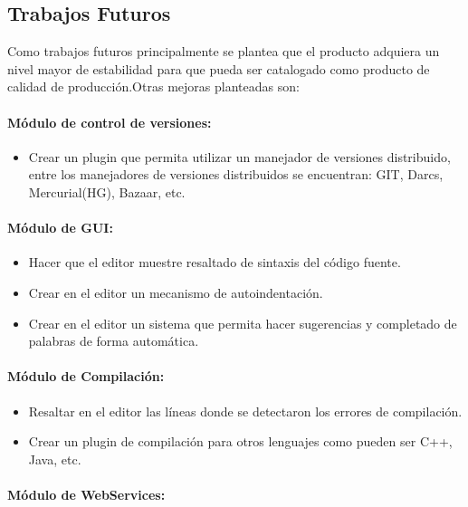 \subsection{Trabajos Futuros}

Como trabajos futuros principalmente se plantea que el producto adquiera un nivel mayor de estabilidad para que pueda ser catalogado como producto de calidad de producción.\newline Otras mejoras planteadas son:

\paragraph{Módulo de control de versiones:}

\begin{itemize}
	\item Crear un plugin que permita utilizar un manejador de versiones distribuido, entre los manejadores de versiones distribuidos se encuentran: GIT, Darcs, Mercurial(HG), Bazaar, etc.
\end{itemize}

\paragraph{Módulo de GUI:}

\begin{itemize}
	\item Hacer que el editor muestre resaltado de sintaxis del código fuente.
	\item Crear en el editor un mecanismo de autoindentación.
	\item Crear en el editor un sistema que permita hacer sugerencias y completado de palabras de forma automática.
\end{itemize}

\paragraph{Módulo de Compilación:}

\begin{itemize}
	\item Resaltar en el editor las líneas donde se detectaron los errores de compilación.
	\item Crear un plugin de compilación para otros lenguajes como pueden ser C++, Java, etc.
\end{itemize}

\paragraph{Módulo de WebServices:}


